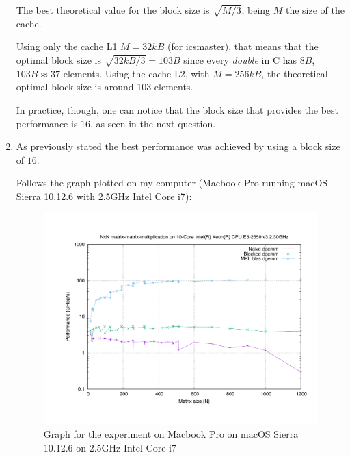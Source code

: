 \documentclass[unicode,11pt,a4paper,oneside,numbers=endperiod,openany]{scrartcl}
\begin{document}
\begin{enumerate}
            The best theoretical value for the block size is $\sqrt{M/3}$, being $M$ the size of the cache.

            Using only the cache L1 $M = 32kB$ (for icsmaster), that means that the optimal block size is $\sqrt{32kB/3} = 103B$ since every \textit{double} in C has $8B$, $103B \approx 37$ elements.
            Using the cache L2, with $M = 256kB$, the theoretical optimal block size is around 103 elements.

            In practice, though, one can notice that the block size that provides the best performance is $16$, as seen in the next question.


        \item  %
            As previously stated the best performance was achieved by using a block size of $16$.

            Follows the graph plotted on my computer (Macbook Pro running macOS Sierra 10.12.6 with 2.5GHz Intel Core i7):

            \begin{figure}[H]
                \includegraphics[width=.8\linewidth]{./results/timing_mac}
                \caption{Graph for the experiment on Macbook Pro on macOS Sierra 10.12.6 on 2.5GHz Intel Core i7}
                \label{timing_mac}
            \end{figure}


\end{enumerate}
\end{document}
